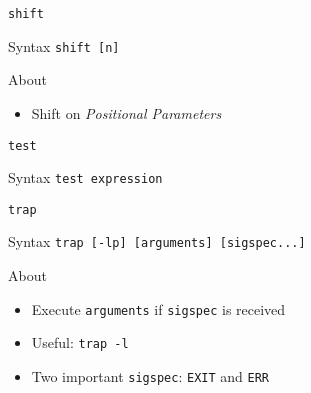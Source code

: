 \documentclass[10pt, compress, aspectratio=169]{beamer}
\begin{document}
\begin{frame}{\texttt{shift}}
  \begin{alertblock}{Syntax}
    \texttt{shift [n]}
  \end{alertblock}

  \begin{exampleblock}{About}
    \begin{itemize}
      \item Shift on \textit{Positional Parameters}
    \end{itemize}
  \end{exampleblock}
\end{frame}

\begin{frame}{\texttt{test}}
  \begin{alertblock}{Syntax}
    \texttt{test expression}
  \end{alertblock}
\end{frame}

\begin{frame}{\texttt{trap}}
  \begin{alertblock}{Syntax}
    \texttt{trap [-lp] [arguments] [sigspec...]}
  \end{alertblock}

  \begin{exampleblock}{About}
    \begin{itemize}
      \item Execute \texttt{arguments} if \texttt{sigspec} is received
      \item Useful: \texttt{trap -l}
      \item Two important \texttt{sigspec}: \texttt{EXIT} and \texttt{ERR}
    \end{itemize}
  \end{exampleblock}

  
\end{frame}

\end{document}
